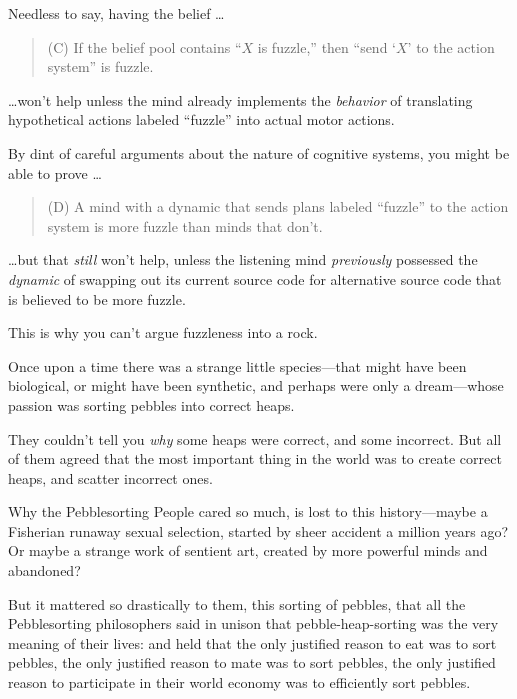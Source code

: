 {
 Needless to say, having the belief \ldots}

\begin{quotation}
{
 (C) If the belief pool contains ``$X$ is
fuzzle,'' then ``send
`$X$' to the action
system'' is fuzzle.}
\end{quotation}

{
 \ldots won't help unless the mind already
implements the \textit{behavior} of translating hypothetical actions
labeled ``fuzzle'' into actual motor
actions.}

{
 By dint of careful arguments about the nature of cognitive
systems, you might be able to prove \ldots}

\begin{quotation}
{
 (D) A mind with a dynamic that sends plans labeled
``fuzzle'' to the action system is
  more fuzzle than minds that don't.}
\end{quotation}

{
 \ldots but that \textit{still} won't help, unless
the listening mind \textit{previously} possessed the \textit{dynamic}
of swapping out its current source code for alternative source code
that is believed to be more fuzzle.}

{
 This is why you can't argue fuzzleness into a
rock.}

\myendsectiontext


{
 Once upon a time there was a strange little species---that might
have been biological, or might have been synthetic, and perhaps were
only a dream---whose passion was sorting pebbles into correct heaps. }

{
 They couldn't tell you \textit{why} some heaps
were correct, and some incorrect. But all of them agreed that the most
important thing in the world was to create correct heaps, and scatter
incorrect ones.}

{
 Why the Pebblesorting People cared so much, is lost to this
history---maybe a Fisherian runaway sexual selection, started by sheer
accident a million years ago? Or maybe a strange work of sentient art,
created by more powerful minds and abandoned?}

{
 But it mattered so drastically to them, this sorting of pebbles,
that all the Pebblesorting philosophers said in unison that
pebble-heap-sorting was the very meaning of their lives: and held that
the only justified reason to eat was to sort pebbles, the only
justified reason to mate was to sort pebbles, the only justified reason
to participate in their world economy was to efficiently sort pebbles.}

